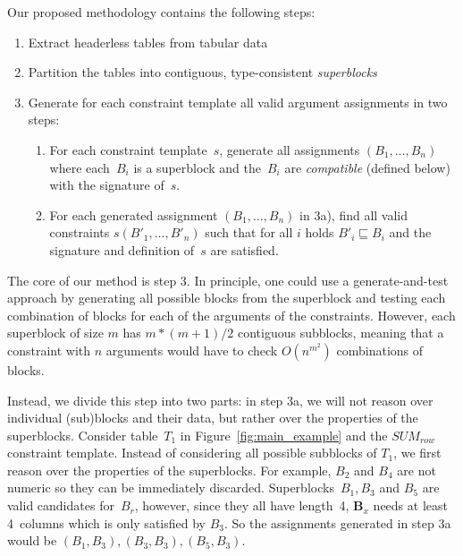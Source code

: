 \documentclass{IEEEtran}
\newcommand{\sbs}{B}
\newcommand{\sbl}[1]{\ensuremath{\sbs_{\textit{#1}}}}
\newcommand{\ssbl}[1]{\ensuremath{\sbs'_{\textit{#1}}}}
\theoremstyle{definition}
\begin{document}
Our proposed methodology contains the following steps:
\begin{enumerate}
\item Extract headerless tables from tabular data
\item Partition the tables into contiguous, type-consistent \textit{superblocks}
\item Generate for each constraint template all valid argument assignments in two steps:
\begin{enumerate}
\item For each constraint template~$s$, generate all assignments $(\sbl{1}, \ldots ,\sbl{n})$ where each~$\sbl{i}$ is a superblock and the~$\sbl{i}$ are \textit{compatible} (defined below) with the signature of~$s$. 
\item For each generated assignment $(\sbl{1}, \ldots ,\sbl{n})$ in 3a), find all valid constraints $s(\ssbl{1}, \ldots, \ssbl{n})$ such that for all $i$ holds $\ssbl{i} \sqsubseteq \sbl{i}$ and the signature and definition of~$s$ are satisfied.
\end{enumerate}
\end{enumerate}

The core of our method is step 3. In principle, one could use a generate-and-test approach by generating all possible blocks from the superblock and testing each combination of blocks for each of the arguments of the constraints. However, each superblock of size $m$ has $m*(m+1)/2$ contiguous subblocks, meaning that a constraint with $n$ arguments would have to check $O(n^{m^2})$ combinations of blocks.

Instead, we divide this step into two parts: in step 3a, we will not reason over individual (sub)blocks and their data, but rather over the properties of the superblocks.
Consider table~$T_1$ in Figure~\ref{fig:main_example} and the $\textit{SUM}_{row}$ constraint template.
Instead of considering all possible subblocks of $T_1$, we first reason over the properties of the superblocks.
For example, $\sbl{2}$ and $\sbl{4}$ are not numeric so they can be immediately discarded.
Superblocks~$\sbl{1}, \sbl{3}$ and $\sbl{5}$ are valid candidates for~$\sbl{r}$, however, since they all have length~4, $\mathbf{\sbl{x}}$ needs at least 4~columns which is only satisfied by $\sbl{3}$.
So the assignments generated in step 3a would be $(\sbl{1}, \sbl{3}), (\sbl{3}, \sbl{3}), (\sbl{5}, \sbl{3})$.
\end{document}
